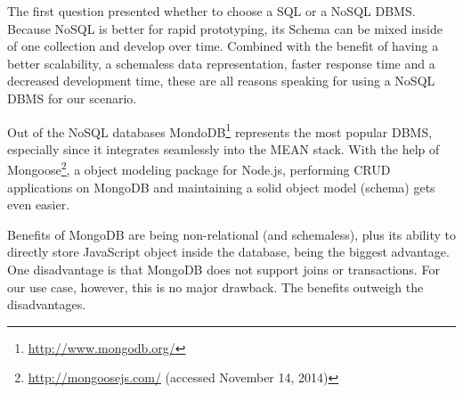 {		The first question presented whether to choose a SQL or a NoSQL DBMS. Because NoSQL is better for rapid prototyping, its Schema can be mixed inside of one collection and develop over time. Combined with the benefit of having a better scalability, a schemaless data representation, faster response time and a decreased development time\cite{vaish2013getting}, these are all reasons speaking for using a NoSQL DBMS for our scenario. 

		Out of the NoSQL databases MondoDB\footnote{\url{http://www.mongodb.org/}} represents the most popular DBMS, especially since it integrates seamlessly into the MEAN stack. With the help of Mongoose\footnote{\url{http://mongoosejs.com/} (accessed November 14, 2014)}, a object modeling package for Node.js, performing CRUD applications on MongoDB and maintaining a solid object model (schema) gets even easier.


		Benefits of MongoDB are being non-relational (and schemaless), plus its ability to directly store JavaScript object inside the database, being the biggest advantage. One disadvantage is that MongoDB does not support joins or transactions. For our use case, however, this is no major drawback. The benefits outweigh the disadvantages.




}

